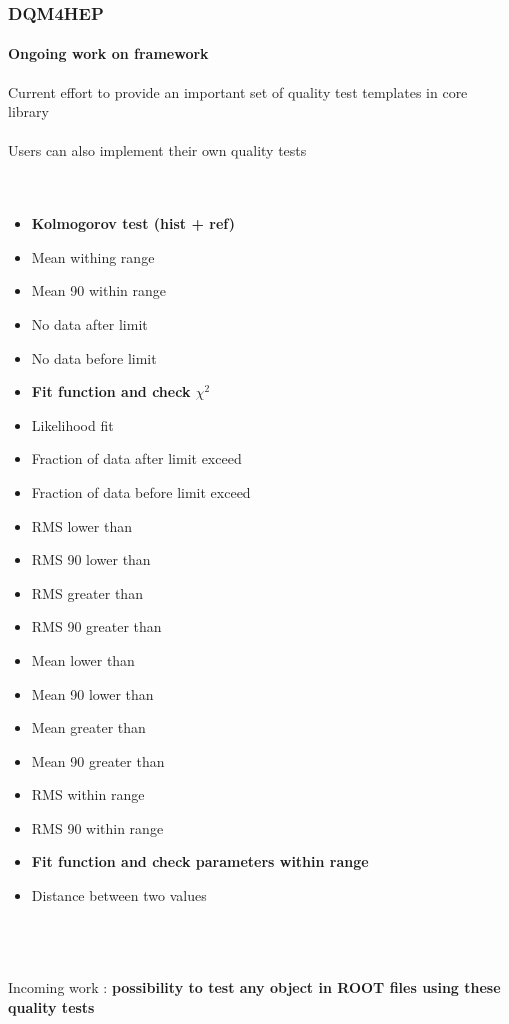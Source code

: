 \documentclass[presentation, 10pt]{beamer}
\begin{document}
\begin{frame}
  \frametitle{DQM4HEP}
  \framesubtitle{Ongoing work on framework}
  \scriptsize
  Current effort to provide an important set of quality test templates in core library \\
  ~ \\
  Users can also implement their own quality tests \\
  ~\\
  ~\\
  \begin{minipage}{0.45\linewidth}
    \begin{itemize}
      \item \textbf{Kolmogorov test (hist + ref)}
      \item Mean withing range
      \item Mean 90 within range
      \item No data after limit
      \item No data before limit
      \item \textbf{Fit function and check $\chi^2$}
      \item Likelihood fit
      \item Fraction of data after limit exceed
      \item Fraction of data before limit exceed
      \item RMS lower than
      \item RMS 90 lower than
    \end{itemize}
  \end{minipage}
  \begin{minipage}{0.53\linewidth}
    \begin{itemize}
      \item RMS greater than
      \item RMS 90 greater than
      \item Mean lower than
      \item Mean 90 lower than
      \item Mean greater than
      \item Mean 90 greater than
      \item RMS within range
      \item RMS 90 within range
      \item \textbf{Fit function and check parameters within range}
      \item Distance between two values
    \end{itemize}
  \end{minipage} \\
  ~\\
  ~\\
  Incoming work : \textbf{possibility to test any object in ROOT files using these quality tests}
\end{frame}
\end{document}
